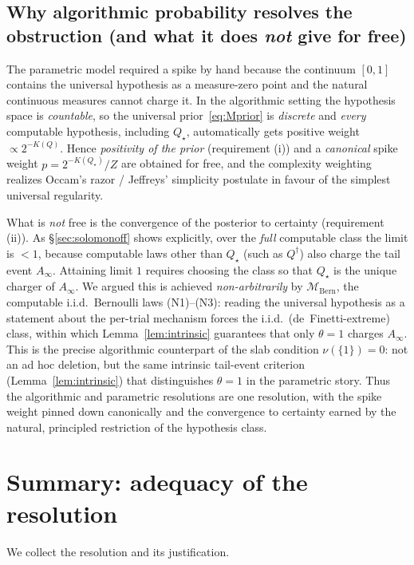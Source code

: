 \documentclass{amsart}
\theoremstyle{definition}
\begin{document}
\subsection{Why algorithmic probability resolves the obstruction
(and what it does \emph{not} give for free)}
The parametric model required a spike by hand because the continuum $[0,1]$
contains the universal hypothesis as a measure-zero point and the natural
continuous measures cannot charge it. In the algorithmic setting the hypothesis
space is \emph{countable}, so the universal prior~\eqref{eq:Mprior} is
\emph{discrete} and \emph{every} computable hypothesis, including $Q_\star$,
automatically gets positive weight $\propto2^{-K(Q)}$. Hence
\emph{positivity of the prior} (requirement (i)) and a \emph{canonical} spike
weight $p=2^{-K(Q_\star)}/Z$ are obtained for free, and the complexity weighting
realizes Occam's razor / Jeffreys' simplicity postulate in favour of the simplest
universal regularity.

What is \emph{not} free is the convergence of the posterior to certainty
(requirement (ii)). As \S\ref{sec:solomonoff} shows explicitly, over the
\emph{full} computable class the limit is $<1$, because computable laws other than
$Q_\star$ (such as $Q^{\dagger}$) also charge the tail event $A_\infty$.
Attaining limit $1$ requires choosing the class so that $Q_\star$ is the unique
charger of $A_\infty$. We argued this is achieved \emph{non-arbitrarily} by
$\mathcal M_{\mathrm{Bern}}$, the computable i.i.d.\ Bernoulli laws (N1)--(N3):
reading the universal hypothesis as a statement about the per-trial mechanism
forces the i.i.d.\ (de~Finetti-extreme) class, within which Lemma~\ref{lem:intrinsic}
guarantees that only $\theta=1$ charges $A_\infty$. This is the precise algorithmic
counterpart of the slab condition $\nu(\{1\})=0$: not an ad hoc deletion, but the
same intrinsic tail-event criterion (Lemma~\ref{lem:intrinsic}) that distinguishes
$\theta=1$ in the parametric story. Thus the algorithmic and parametric
resolutions are one resolution, with the spike weight pinned down canonically and
the convergence to certainty earned by the natural, principled restriction of the
hypothesis class.


\section{Summary: adequacy of the resolution}\label{sec:summary}

We collect the resolution and its justification.
\end{document}
